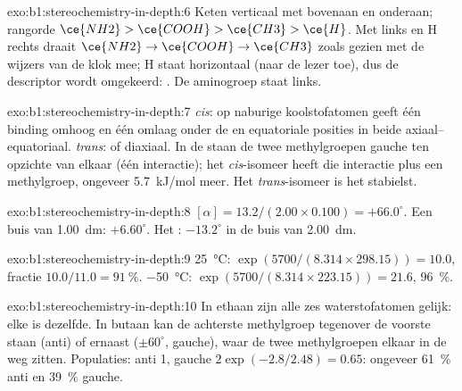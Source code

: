 \begin{solution}{exo:b1:stereochemistry-in-depth:6}
Keten verticaal met  bovenaan en  onderaan; rangorde
$\ce{NH2} > \ce{COOH} > \ce{CH3} > \ce{H}$. Met  links en H
rechts draait $\ce{NH2} \to \ce{COOH} \to \ce{CH3}$ zoals gezien met de
wijzers van de klok mee; H staat horizontaal (naar de lezer toe), dus de
descriptor wordt omgekeerd: . De aminogroep staat links.
\end{solution}

\begin{solution}{exo:b1:stereochemistry-in-depth:7}
\textit{cis}: op naburige koolstofatomen geeft één binding omhoog en één
omlaag onder de  en equatoriale posities in beide 
axiaal--equatoriaal. \textit{trans}:  of diaxiaal. In de
  staan de twee methylgroepen gauche ten opzichte van
elkaar (één interactie); het \textit{cis}-isomeer heeft die interactie
plus een  methylgroep, ongeveer \qty{5.7}{kJ/mol} meer. Het
\textit{trans}-isomeer is het stabielst.
\end{solution}

\begin{solution}{exo:b1:stereochemistry-in-depth:8}
$[\alpha] = 13.2/(2.00 \times 0.100) = +66.0^\circ$. Een buis van
\qty{1.00}{dm}: $+6.60^\circ$. Het : $-13.2^\circ$ in de buis
van \qty{2.00}{dm}.
\end{solution}

\begin{solution}{exo:b1:stereochemistry-in-depth:9}
\qty{25}{\celsius}: $\exp(5700/(8.314 \times 298.15)) = 10.0$, fractie
$10.0/11.0 = \qty{91}{\percent}$. \qty{-50}{\celsius}: $\exp(5700/(8.314
\times 223.15)) = 21.6$, \qty{96}{\percent}.
\end{solution}

\begin{solution}{exo:b1:stereochemistry-in-depth:10}
In ethaan zijn alle zes waterstofatomen gelijk: elke  is dezelfde. In butaan kan de achterste methylgroep tegenover
de voorste staan (anti) of ernaast ($\pm 60^\circ$, gauche), waar de twee
methylgroepen elkaar in de weg zitten. Populaties: anti 1, gauche
$2\exp(-2.8/2.48) = 0.65$: ongeveer \qty{61}{\percent} anti en
\qty{39}{\percent} gauche.
\end{solution}

